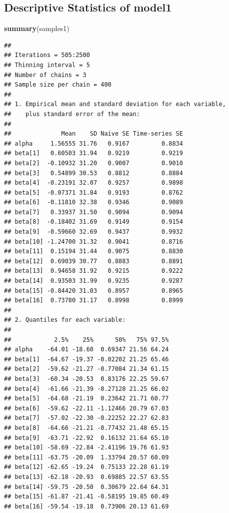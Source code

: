 \documentclass[
]{article}
\newenvironment{Shaded}{\begin{snugshade}}{\end{snugshade}}
\newcommand{\FunctionTok}[1]{\textcolor[rgb]{0.13,0.29,0.53}{\textbf{#1}}}
\newcommand{\NormalTok}[1]{#1}
\begin{document}
\subsection{Descriptive Statistics of
model1}\label{descriptive-statistics-of-model1}

\begin{Shaded}
\begin{Highlighting}[]
\FunctionTok{summary}\NormalTok{(samples1)}
\end{Highlighting}
\end{Shaded}

\begin{verbatim}
## 
## Iterations = 505:2500
## Thinning interval = 5 
## Number of chains = 3 
## Sample size per chain = 400 
## 
## 1. Empirical mean and standard deviation for each variable,
##    plus standard error of the mean:
## 
##              Mean    SD Naive SE Time-series SE
## alpha     1.56555 31.76   0.9167         0.8834
## beta[1]   0.60503 31.94   0.9219         0.9219
## beta[2]  -0.10932 31.20   0.9007         0.9010
## beta[3]   0.54899 30.53   0.8812         0.8884
## beta[4]  -0.23191 32.07   0.9257         0.9898
## beta[5]  -0.07371 31.84   0.9193         0.8762
## beta[6]  -0.11810 32.38   0.9346         0.9089
## beta[7]   0.33937 31.50   0.9094         0.9094
## beta[8]  -0.18402 31.69   0.9149         0.9154
## beta[9]  -0.59660 32.69   0.9437         0.9932
## beta[10] -1.24700 31.32   0.9041         0.8716
## beta[11]  0.15194 31.44   0.9075         0.8830
## beta[12]  0.69039 30.77   0.8883         0.8891
## beta[13]  0.94658 31.92   0.9215         0.9222
## beta[14]  0.93503 31.99   0.9235         0.9287
## beta[15] -0.84420 31.03   0.8957         0.8965
## beta[16]  0.73780 31.17   0.8998         0.8999
## 
## 2. Quantiles for each variable:
## 
##            2.5%    25%      50%   75% 97.5%
## alpha    -64.01 -18.60  0.69347 21.56 64.24
## beta[1]  -64.67 -19.37 -0.02202 21.25 65.46
## beta[2]  -59.62 -21.27 -0.77084 21.34 61.15
## beta[3]  -60.34 -20.53  0.83176 22.25 59.67
## beta[4]  -61.66 -21.39 -0.27128 21.25 66.02
## beta[5]  -64.68 -21.19  0.23642 21.71 60.77
## beta[6]  -59.62 -22.11 -1.12466 20.79 67.03
## beta[7]  -57.02 -22.30 -0.22252 22.27 62.83
## beta[8]  -64.66 -21.21 -0.77432 21.48 65.15
## beta[9]  -63.71 -22.92  0.16132 21.64 65.10
## beta[10] -58.69 -22.84 -2.41196 19.76 61.93
## beta[11] -63.75 -20.09  1.33794 20.57 60.09
## beta[12] -62.65 -19.24  0.75133 22.28 61.19
## beta[13] -62.18 -20.93  0.69885 22.57 63.55
## beta[14] -59.75 -20.50  0.30679 22.64 64.31
## beta[15] -61.87 -21.41 -0.58195 19.85 60.49
## beta[16] -59.54 -19.18  0.73906 20.13 61.69
\end{verbatim}
\end{document}
